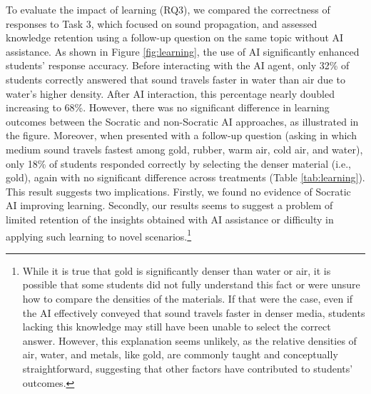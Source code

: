\documentclass[
  12pt,
]{article}
\begin{document}
To evaluate the impact of learning (RQ3), we compared the correctness of responses to Task 3, which focused on sound propagation, and assessed knowledge retention using a follow-up question on the same topic without AI assistance. As shown in Figure \ref{fig:learning}, the use of AI significantly enhanced students' response accuracy. Before interacting with the AI agent, only 32\% of students correctly answered that sound travels faster in water than air due to water's higher density. After AI interaction, this percentage nearly doubled increasing to 68\%. However, there was no significant difference in learning outcomes between the Socratic and non-Socratic AI approaches, as illustrated in the figure. Moreover, when presented with a follow-up question (asking in which medium sound travels fastest among gold, rubber, warm air, cold air, and water), only 18\% of students responded correctly by selecting the denser material (i.e., gold), again with no significant difference across treatments (Table \ref{tab:learning}). This result suggests two implications. Firstly, we found no evidence of Socratic AI improving learning. Secondly, our results seems to suggest a problem of limited retention of the insights obtained with AI assistance or difficulty in applying such learning to novel scenarios.\footnote{While it is true that gold is significantly denser than water or air, it is possible that some students did not fully understand this fact or were unsure how to compare the densities of the materials. If that were the case, even if the AI effectively conveyed that sound travels faster in denser media, students lacking this knowledge may still have been unable to select the correct answer. However, this explanation seems unlikely, as the relative densities of air, water, and metals, like gold, are commonly taught and conceptually straightforward, suggesting that other factors have contributed to students' outcomes.}
\end{document}
